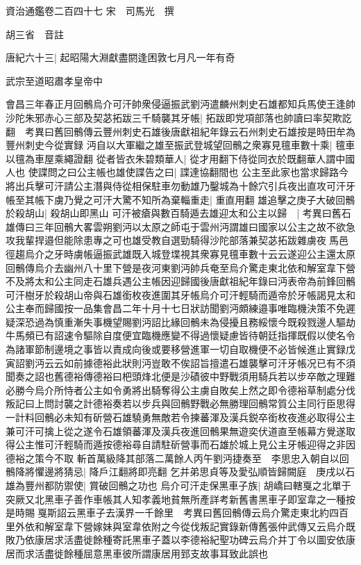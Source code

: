資治通鑑卷二百四十七
宋　司馬光　撰

胡三省　音註

唐紀六十三|{
	起昭陽大淵獻盡閼逢困敦七月凡一年有奇}


武宗至道昭肅孝皇帝中

會昌三年春正月回鶻烏介可汗帥衆侵逼振武劉沔遣麟州刺史石雄都知兵馬使王逢帥沙陀朱邪赤心三部及契苾拓跋三千騎襲其牙帳|{
	拓跋即党項部落也帥讀曰率契欺訖翻　考異曰舊回鶻傳云豐州刺史石雄後唐獻祖紀年錄云石州刺史石雄按是時田牟為豐州刺史今從實録}
沔自以大軍繼之雄至振武登城望回鶻之衆寡見氊車數十乘|{
	氊車以氊為車屋乘繩證翻}
從者皆衣朱碧類華人|{
	從才用翻下侍從同衣於既翻華人謂中國人也}
使諜問之曰公主帳也雄使諜告之曰|{
	諜達協翻間也}
公主至此家也當求歸路今將出兵擊可汗請公主潛與侍從相保駐車勿動雄乃鑿城為十餘穴引兵夜出直攻可汗牙帳至其帳下虜乃覺之可汗大驚不知所為棄輜重走|{
	重直用翻}
雄追擊之庚子大破回鶻於殺胡山|{
	殺胡山即黑山}
可汗被瘡與數百騎遁去雄迎太和公主以歸　|{
	考異曰舊石雄傳曰三年回鶻大畧雲朔劉沔以太原之師屯于雲州沔謂雄曰國家以公主之故不欲急攻我輩捍邉但能除患專之可也雄受教自選勁騎得沙陀部落兼契苾拓跋雜虜夜馬邑徑趨烏介之牙時虜帳逼振武雄既入城登堞視其衆寡見氊車數十云云遂迎公主還太原回鶻傳烏介去幽州八十里下營是夜河東劉沔帥兵奄至烏介驚走東北依和解室韋下營不及將太和公主同走石雄兵遇公主帳因迎歸國後唐獻祖紀年錄曰沔表帝為前鋒回鶻可汗樹牙於殺胡山帝與石雄銜枚夜進圍其牙帳烏介可汗輕騎而遁帝於牙帳謁見太和公主奉而歸國按一品集會昌二年十月十七日狀訪聞劉沔頗練邉事唯臨機決策不免遲疑深恐過為慎重漸失事機望賜劉沔詔比緣回鶻未為侵擾且務綏懷今既殺戮邊人驅劫牛馬頻已有詔速令驅除自度便宜臨機應變不得過懷疑慮皆待朝廷指揮既假以使名令為諸軍節制邊境之事皆以責成向後或要移營進軍一切自取機便不必皆候進止實録戊寅詔劉沔云云如前據德裕此狀則沔豈敢不俟詔旨擅遣石雄襲擊可汗牙帳况已有不須聞奏之詔也舊德裕傳德裕曰杷頭烽北便是沙磧彼中野戰須用騎兵若以步卒敵之理難必勝今烏介所恃者公主如令勇將出騎奪得公主虜自敗矣上然之即令德裕草制處分伐叛記曰上問討襲之計德裕奏若以步兵與回鶻野戰必無勝理回鶻常質公主同行臣思得一計料回鶻必未知有斫營石雄驍勇無敵若令揀蕃渾及漢兵鋭卒銜枚夜進必取得公主兼可汗可擒上從之遂令石雄領蕃渾及漢兵夜進回鶻果無遊奕伏道直至帳幕方覺遂取得公主惟可汗輕騎而遁按德裕尋自請駐斫營事而石雄於城上見公主牙帳迎得之非因德裕之策今不取}
斬首萬級降其部落二萬餘人丙午劉沔捷奏至　李思忠入朝自以回鶻降將懼邊將猜忌|{
	降戶江翻將即亮翻}
乞并弟思貞等及愛弘順皆歸闕庭　庚戌以石雄為豐州都防禦使|{
	賞破回鶻之功也}
烏介可汗走保黑車子族|{
	胡嶠曰轄戛之北單于突厥又北黑車子善作車帳其人知孝義地貧無所產詳考新舊書黑車子即室韋之一種按是時賜戛斯詔云黑車子去漢界一千餘里　考異曰舊回鶻傳云烏介驚走東北約四百里外依和解室韋下營嫁妹與室韋依附之今從伐叛記實錄新傳舊張仲武傳又云烏介既敗乃依康居求活盡徙餘種寄託黑車子蓋以李德裕紀聖功碑云烏介并丁令以圖安依康居而求活盡徙餘種屈意黑車彼所謂康居用郅支故事耳致此誤也}
